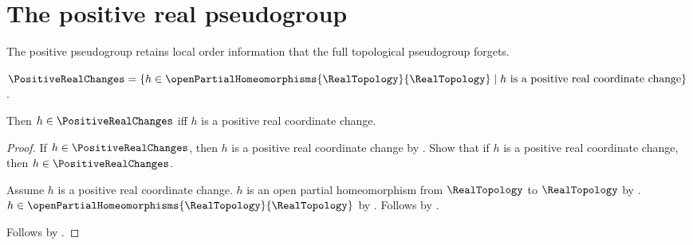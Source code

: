 \section{The positive real pseudogroup}




The positive pseudogroup retains local order information that the full
topological pseudogroup forgets.

\begin{definition}\label{positive_real_changes}
    $\PositiveRealChanges=\{h\in\openPartialHomeomorphisms{\RealTopology}{\RealTopology}
        \mid\text{$h$ is a positive real coordinate change}\}$.
\end{definition}

\begin{theorem}\label{positive_real_changes_iff}
    Then $h\in\PositiveRealChanges$ iff $h$ is a positive real coordinate change.
\end{theorem}
\begin{proof}
    If $h\in\PositiveRealChanges$, then $h$ is a positive real coordinate change by
        .
    Show that if $h$ is a positive real coordinate change, then $h\in\PositiveRealChanges$.
    \begin{subproof}
        Assume $h$ is a positive real coordinate change.
        $h$ is an open partial homeomorphism from $\RealTopology$ to $\RealTopology$ by
            .
        $h\in\openPartialHomeomorphisms{\RealTopology}{\RealTopology}$ by
            .
        Follows by .
    \end{subproof}
    Follows by \auto.
\end{proof}

